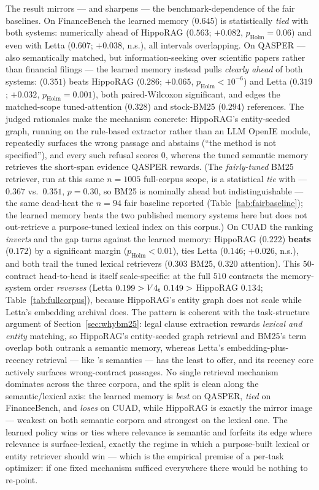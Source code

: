 The result mirrors --- and sharpens --- the benchmark-dependence of the fair
baselines. On FinanceBench the learned memory ($0.645$) is statistically
\emph{tied} with both systems: numerically ahead of HippoRAG ($0.563$; $+0.082$,
$p_{\mathrm{Holm}}{=}0.06$) and even with Letta ($0.607$; $+0.038$, n.s.), all
intervals overlapping. On QASPER --- also semantically matched, but
information-seeking over scientific papers rather than financial filings --- the
learned memory instead pulls \emph{clearly ahead} of both systems: \Vt{}
($0.351$) beats HippoRAG ($0.286$; $+0.065$, $p_{\mathrm{Holm}}{<}10^{-6}$) and
Letta ($0.319$; $+0.032$, $p_{\mathrm{Holm}}{=}0.001$), both paired-Wilcoxon
significant, and edges the matched-scope tuned-attention ($0.328$) and stock-BM25
($0.294$) references. The judged rationales make the mechanism concrete:
HippoRAG's entity-seeded graph, running on the rule-based extractor rather than an
LLM OpenIE module, repeatedly surfaces the wrong passage and abstains (``the
method is not specified''), and every such refusal scores $0$, whereas the tuned
semantic memory retrieves the short-span evidence QASPER rewards. (The
\emph{fairly-tuned} BM25 retriever, run at this same $n{=}1005$ full-corpus scope,
is a statistical \emph{tie} with \Vt{} --- $0.367$ vs.\ $0.351$, $p{=}0.30$, so
BM25 is nominally ahead but indistinguishable --- the same dead-heat the $n{=}94$
fair baseline reported (Table~\ref{tab:fairbaseline}); the learned memory beats
the two published memory systems here but does not out-retrieve a purpose-tuned
lexical index on this corpus.) On CUAD the ranking \emph{inverts} and the gap turns
against the learned memory: HippoRAG ($0.222$) \textbf{beats} \Vt{} ($0.172$) by a
significant margin ($p_{\mathrm{Holm}}{<}0.01$), \Vt{} ties Letta ($0.146$;
$+0.026$, n.s.), and both trail the tuned lexical retrievers ($0.303$ BM25,
$0.320$ attention). This $50$-contract head-to-head is itself scale-specific: at
the full $510$ contracts the memory-system order \emph{reverses} (Letta $0.199 >
V4\textsubscript{t}{}\ 0.149 >$ HippoRAG $0.134$; Table~\ref{tab:fullcorpus}), because HippoRAG's
entity graph does not scale while Letta's embedding archival does. The pattern is
coherent with the task-structure argument of
Section~\ref{sec:whybm25}: legal clause extraction rewards \emph{lexical and
entity} matching, so HippoRAG's entity-seeded graph retrieval and BM25's term
overlap both outrank a semantic memory, whereas Letta's embedding-plus-recency
retrieval --- like \Vt{}'s semantics --- has the least to offer, and its recency
core actively surfaces wrong-contract passages. No single retrieval mechanism
dominates across the three corpora, and the split is clean along the
semantic/lexical axis: the learned memory is \emph{best} on QASPER, \emph{tied}
on FinanceBench, and \emph{loses} on CUAD, while HippoRAG is exactly the mirror
image --- weakest on both semantic corpora and strongest on the lexical one. The
learned policy wins or ties where relevance is semantic and forfeits its edge
where relevance is surface-lexical, exactly the regime in which a purpose-built
lexical or entity retriever should win --- which is the empirical premise of a
per-task optimizer: if one fixed mechanism sufficed everywhere there would be
nothing to re-point.

